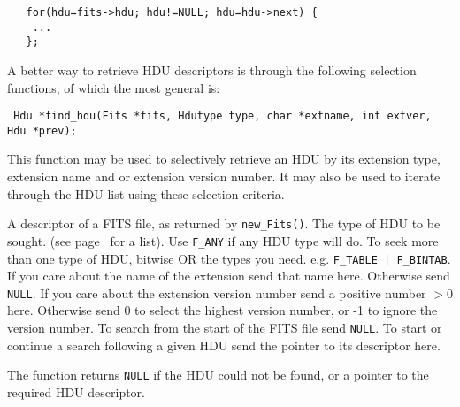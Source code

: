 \begin{verbatim}
   for(hdu=fits->hdu; hdu!=NULL; hdu=hdu->next) {
    ...
   };
\end{verbatim}

A better way to retrieve HDU descriptors is through the following selection
functions, of which the most general is:
\label{find_hdu}\begin{verbatim}
 Hdu *find_hdu(Fits *fits, Hdutype type, char *extname, int extver, Hdu *prev);
\end{verbatim}
This function may be used to selectively retrieve an HDU by its
extension type, extension name and or extension version number. It may
also be used to iterate through the HDU list using these selection
criteria.

\begin{arglist}
    A descriptor of a FITS file, as returned by \verb`new_Fits()`.
    The type of HDU to be sought. (see
             page~\pageref{Hdutype} for a list). Use \verb`F_ANY` if any HDU
             type will do.  
             To seek more than one type of HDU, bitwise OR the
             types you need. e.g. \verb`F_TABLE | F_BINTAB`.
  If you care about the name of the extension send that
             name here. Otherwise send \verb`NULL`.
  If you care about the extension version number send a
             positive number $> 0$ here. Otherwise send 0 to select the
             highest version number, or -1 to ignore the version number.
    To search from the start of the FITS file send \verb`NULL`.
             To start or continue a search following a given HDU
             send the pointer to its descriptor here.
\end{arglist}
The function returns \verb`NULL` if the HDU could not be found, or a pointer
to the required HDU descriptor.


